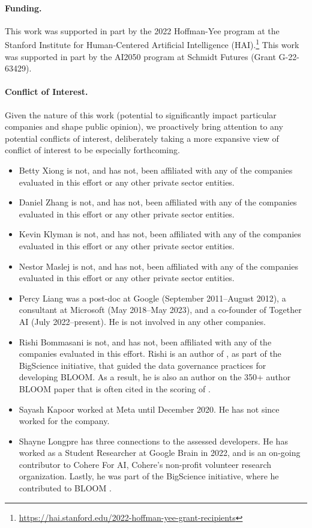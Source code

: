 \paragraph{Funding.}
This work was supported in part by the 2022 Hoffman-Yee program at the Stanford Institute for Human-Centered Artificial Intelligence (HAI).\footnote{\url{https://hai.stanford.edu/2022-hoffman-yee-grant-recipients}}
This work was supported in part by the AI2050 program at Schmidt Futures (Grant G-22-63429).

\paragraph{Conflict of Interest.}
Given the nature of this work (\eg potential to significantly impact particular companies and shape public opinion), we proactively bring attention to any potential conflicts of interest, deliberately taking a more expansive view of conflict of interest to be especially forthcoming.

\begin{itemize}
    \item Betty Xiong is not, and has not, been affiliated with any of the companies evaluated in this effort or any other private sector entities.
    \item Daniel Zhang is not, and has not, been affiliated with any of the companies evaluated in this effort or any other private sector entities.  
    \item Kevin Klyman is not, and has not, been affiliated with any of the companies evaluated in this effort or any other private sector entities.
    \item Nestor Maslej is not, and has not, been affiliated with any of the companies evaluated in this effort or any other private sector entities. 
    \item Percy Liang was a post-doc at Google (September 2011--August 2012), a consultant at Microsoft (May 2018--May 2023), and a co-founder of Together AI (July 2022--present).
    He is not involved in any other companies. 
    \item Rishi Bommasani is not, and has not, been affiliated with any of the companies evaluated in this effort. 
    Rishi is an author of \citet{jernite2022governance}, as part of the BigScience initiative, that guided the data governance practices for developing BLOOM. 
    As a result, he is also an author on the 350+ author BLOOM paper \citep{scao2022bloom} that is often cited in the scoring of \bloomz.  
    \item Sayash Kapoor worked at Meta until December 2020. He has not since worked for the company.
    \item Shayne Longpre has three connections to the assessed developers.
    He has worked as a Student Researcher at Google Brain in 2022, and is an on-going contributor to Cohere For AI, Cohere's non-profit volunteer research organization.
    Lastly, he was part of the BigScience initiative, where he contributed to BLOOM \citep{scao2022bloom}.
\end{itemize}